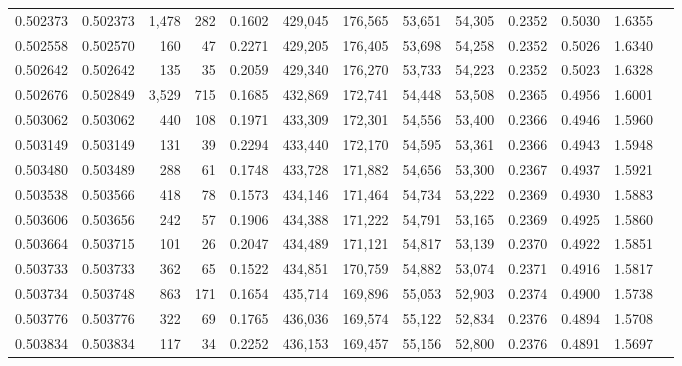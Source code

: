 \begin{tabular}{rrrrrrrrrrrrr}
0.502373 & 0.502373 & 1,478 &   282 &                                     0.1602 & 429,045 & 176,565 &  53,651 &  54,305 & 0.2352 & 0.5030 & 1.6355 \\
0.502558 & 0.502570 &   160 &    47 &                                     0.2271 & 429,205 & 176,405 &  53,698 &  54,258 & 0.2352 & 0.5026 & 1.6340 \\
0.502642 & 0.502642 &   135 &    35 &                                     0.2059 & 429,340 & 176,270 &  53,733 &  54,223 & 0.2352 & 0.5023 & 1.6328 \\
0.502676 & 0.502849 & 3,529 &   715 &                                     0.1685 & 432,869 & 172,741 &  54,448 &  53,508 & 0.2365 & 0.4956 & 1.6001 \\
0.503062 & 0.503062 &   440 &   108 &                                     0.1971 & 433,309 & 172,301 &  54,556 &  53,400 & 0.2366 & 0.4946 & 1.5960 \\
0.503149 & 0.503149 &   131 &    39 &                                     0.2294 & 433,440 & 172,170 &  54,595 &  53,361 & 0.2366 & 0.4943 & 1.5948 \\
0.503480 & 0.503489 &   288 &    61 &                                     0.1748 & 433,728 & 171,882 &  54,656 &  53,300 & 0.2367 & 0.4937 & 1.5921 \\
0.503538 & 0.503566 &   418 &    78 &                                     0.1573 & 434,146 & 171,464 &  54,734 &  53,222 & 0.2369 & 0.4930 & 1.5883 \\
0.503606 & 0.503656 &   242 &    57 &                                     0.1906 & 434,388 & 171,222 &  54,791 &  53,165 & 0.2369 & 0.4925 & 1.5860 \\
0.503664 & 0.503715 &   101 &    26 &                                     0.2047 & 434,489 & 171,121 &  54,817 &  53,139 & 0.2370 & 0.4922 & 1.5851 \\
0.503733 & 0.503733 &   362 &    65 &                                     0.1522 & 434,851 & 170,759 &  54,882 &  53,074 & 0.2371 & 0.4916 & 1.5817 \\
0.503734 & 0.503748 &   863 &   171 &                                     0.1654 & 435,714 & 169,896 &  55,053 &  52,903 & 0.2374 & 0.4900 & 1.5738 \\
0.503776 & 0.503776 &   322 &    69 &                                     0.1765 & 436,036 & 169,574 &  55,122 &  52,834 & 0.2376 & 0.4894 & 1.5708 \\
0.503834 & 0.503834 &   117 &    34 &                                     0.2252 & 436,153 & 169,457 &  55,156 &  52,800 & 0.2376 & 0.4891 & 1.5697 \\

\end{tabular}
